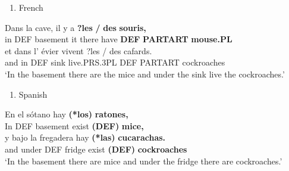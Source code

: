 \begin{enumerate} %
\item 
\label{bkm:Ref172696738}French

\end{enumerate} %
\ea\label{}
\gll Dans  la  cave,  il  y  a  \textbf{?les} \textbf{/} \textbf{des} \textbf{souris,}\\


in  DEF  basement  it  there  have  \textbf{DEF}  \textbf{PARTART} \textbf{mouse.PL}\\ %


\ea\label{}
\gll et  dans  l’  évier  vivent  ?les  /  des  cafards.\\


and  in  DEF  sink  live.PRS.3PL  DEF    PARTART  cockroaches\\ %


‘In the basement there are the mice and under the sink live the cockroaches.’ 
\z


\begin{enumerate} %
\item 
Spanish

\end{enumerate} %
\ea\label{}
\gll En  el  sótano  hay  \textbf{(*los)}\textbf{  ratones,}\\


In  DEF  basement  exist  \textbf{(DEF)} \textbf{mice,}\\ %


\ea\label{}
\gll y  bajo  la  fregadera  hay  \textbf{(*las)} \textbf{cucarachas.}\\


and  under  DEF  fridge  exist  \textbf{(DEF)} \textbf{cockroaches}\\ %


‘In the basement there are mice and under the fridge there are cockroaches.’  
\z


